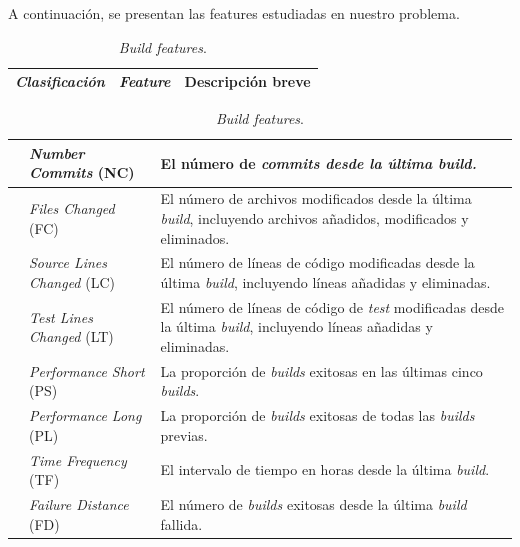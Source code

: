 \noindent A continuación, se presentan las features estudiadas en nuestro problema.

\begin{table}[H]
    \centering
    \caption{\textit{Build features}.}
    \label{tab:features}

    \begin{tabular}{|>{\centering\arraybackslash}m{3cm}|>{\centering\arraybackslash}m{4cm}|>{\centering\arraybackslash}m{7cm}|} %
        \hline
        \textbf{\textit{Clasificación}} &\textbf{\textit{Feature}} & \textbf{Descripción breve} \\
        \hline
    \end{tabular}
    \begin{tabular}{|>{\raggedright\arraybackslash}m{3cm}|>{\raggedright\arraybackslash}m{4cm}|>{\raggedright\arraybackslash}m{7cm}|} %
        \hline
        \multirow{4}{=}{Consideradas en SmartBuildSkip} & \textit{Number Commits} (NC) & El número de \textit{commits desde la última \textit{build}.} \\
        \cline{2-3}
        & \textit{Files Changed} (FC) & El número de archivos modificados desde la última \textit{build}, incluyendo archivos añadidos, modificados y eliminados.\\
        \cline{2-3}
        & \textit{Source Lines Changed} (LC) & El número de líneas de código modificadas desde la última \textit{build}, incluyendo líneas añadidas y eliminadas.\\
        \cline{2-3}
        & \textit{Test Lines Changed} (LT) & El número de líneas de código de \textit{test} modificadas desde la última \textit{build}, incluyendo líneas añadidas y eliminadas.\\
        \Xhline{1pt}
        \multirow{6}{=}{Consideradas en SmartBuildSkip pero no utilizadas} & \textit{Performance Short} (PS) & La proporción de \textit{builds} exitosas en las últimas cinco \textit{builds}.\\
        \cline{2-3}
        & \textit{Performance Long} (PL) & La proporción de \textit{builds} exitosas de todas las \textit{builds} previas.\\
        \cline{2-3}
        & \textit{Time Frequency} (TF) & El intervalo de tiempo en horas desde la última \textit{build}.\\
        \cline{2-3}
        & \textit{Failure Distance} (FD) & El número de \textit{builds} exitosas desde la última \textit{build} fallida.\\

\end{tabular}
\end{table}
